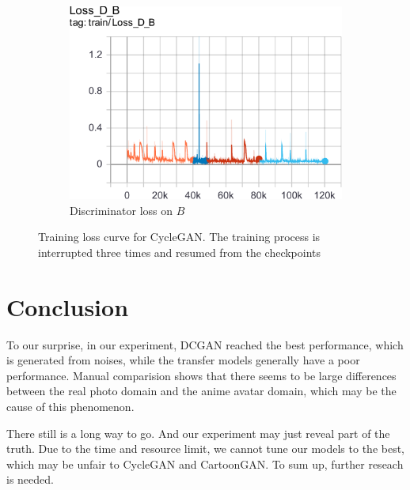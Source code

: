 \documentclass[10pt,twocolumn,letterpaper]{article}
\begin{document}
\begin{figure}[h]
\begin{subfigure}{.24\linewidth}
      \includegraphics[width=\linewidth]{cyclegan-loss_d_b}
      \caption{Discriminator loss on $B$}
   \end{subfigure}
   \caption{Training loss curve for CycleGAN. The training process is
   interrupted three times and resumed from the checkpoints}
   \label{fig:cyclegan-loss}
\end{figure}

\section{Conclusion}

To our surprise, in our experiment, DCGAN reached the best performance, which is
generated from noises, while the transfer models generally have a poor
performance. Manual comparision shows that there seems to be large differences
between the real photo domain and the anime avatar domain, which may be the
cause of this phenomenon.

There still is a long way to go. And our experiment may just reveal part of the
truth. Due to the time and resource limit, we cannot tune our models to the
best, which may be unfair to CycleGAN and CartoonGAN. To sum up, further
reseach is needed.

{\small


}
\end{document}
